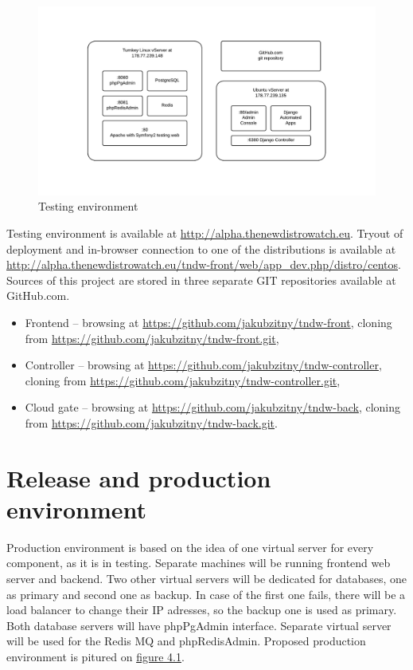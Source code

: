\documentclass[thesis=B,english]{FITthesis}[2013/04/26]
\begin{document}
\begin{figure}[h!]
	\includegraphics[trim=2.5cm 2cm 3cm 2cm, clip=true, totalheight=190pt]{images/tndw-test.pdf}
	\caption{Testing environment}
	\label{fig: tndw-test}
\end{figure}

Testing environment is available at \url{http://alpha.thenewdistrowatch.eu}. Tryout of deployment and in-browser connection to one of the distributions is available at \url{http://alpha.thenewdistrowatch.eu/tndw-front/web/app_dev.php/distro/centos}. \\

Sources of this project are stored in three separate GIT repositories available at GitHub.com.

\begin{itemize}
	\item Frontend -- browsing at \url{https://github.com/jakubzitny/tndw-front}, cloning from \url{https://github.com/jakubzitny/tndw-front.git},
	\item Controller -- browsing at \url{https://github.com/jakubzitny/tndw-controller}, cloning from \url{https://github.com/jakubzitny/tndw-controller.git},
	\item Cloud gate -- browsing at \url{https://github.com/jakubzitny/tndw-back}, cloning from \url{https://github.com/jakubzitny/tndw-back.git}.
\end{itemize}

\chapter{Release and production environment}
\label{chapter:producion}

Production environment is based on the idea of one virtual server for every component, as it is in testing. Separate machines will be running frontend web server and backend. Two other virtual servers will be dedicated for databases, one as primary and second one as backup. In case of the first one fails, there will be a load balancer to change their IP adresses, so the backup one is used as primary. Both database servers will have phpPgAdmin interface. Separate virtual server will be used for the Redis MQ and phpRedisAdmin. Proposed production environment is pitured on \hyperref[fig:tndw-prod]{figure 4.1}.
\end{document}
